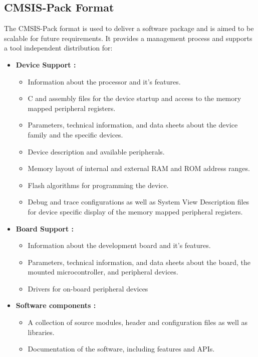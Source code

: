 \subsection{CMSIS-Pack Format}
The CMSIS-Pack format is used to deliver a software package and is aimed to be scalable for future requirements. It provides a management process and supports a tool independent distribution for:
\begin{itemize}
	\item \textbf{Device Support :}
	\begin{itemize}
		\item Information about the processor and it's features.
		\item C and assembly files for the device startup and access to the memory mapped peripheral registers.
		\item Parameters, technical information, and data sheets about the device family and the specific devices.
		\item Device description and available peripherals.
		\item Memory layout of internal and external RAM and ROM address ranges.
		\item Flash algorithms for programming the device.
		\item Debug and trace configurations as well as System View Description files for device specific display of the memory mapped peripheral registers.
	\end{itemize}
	\item \textbf{Board Support :}
	\begin{itemize}
		\item Information about the development board and it's features.
		\item Parameters, technical information, and data sheets about the board, the mounted microcontroller, and peripheral devices.
		\item Drivers for on-board peripheral devices
	\end{itemize}
	\item \textbf{Software components :}
	\begin{itemize}
		\item A collection of source modules, header and configuration files as well as libraries.
		\item Documentation of the software, including features and APIs.
	\end{itemize}
\end{itemize}
